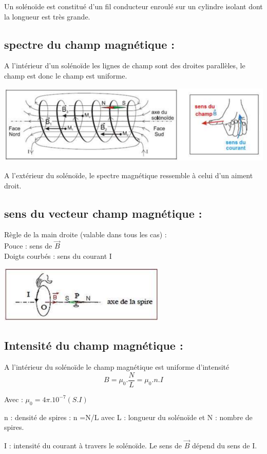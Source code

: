 \documentclass[12pt]{article}
\begin{document}
Un solénoïde est constitué d’un fil conducteur enroulé sur un cylindre
isolant dont la longueur est très grande.

\subsection{spectre du champ magnétique : }
A l’intérieur d’un solénoïde les lignes de champ sont des droites parallèles,
le champ est donc le champ est uniforme.
\begin{center}
\includegraphics[width=1\textwidth]{./img/solénoïde_Spectre.png}
\end{center}
A l’extérieur du solénoïde, le spectre magnétique ressemble à celui d’un aiment droit.

\subsection{sens du vecteur champ magnétique :}
Règle de la main droite (valable dans tous les cas) :
\\Pouce : sens de $\vec{B}$
\\Doigts courbés : sens du courant I
\begin{center}
\includegraphics[width=0.6\textwidth]{./img/solen_sens.png}
\end{center}

\subsection{Intensité du champ magnétique :}

A l’intérieur du solénoïde le champ magnétique est uniforme d’intensité
$$B = \mu_0.\frac{N}{L} = \mu_0.n.I$$

Avec : $\mu_0 = 4\pi.10^{-7}(S. I)$

n : densité de spires : n =N/L
avec L : longueur du solénoïde et N : nombre de spires.

I : intensité du courant à travers le solénoïde. Le sens de $\vec{B}$ dépend du sens de I.
\end{document}
